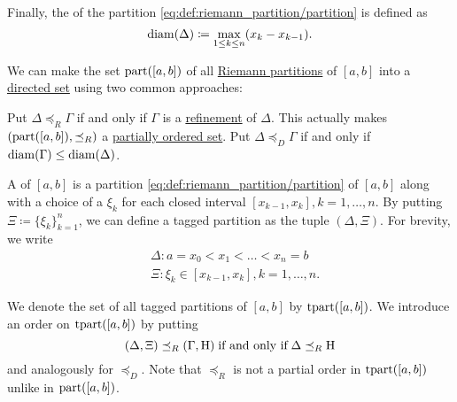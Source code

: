 \begin{definition}
\begin{thmenum}
     Finally, the  of the partition \eqref{eq:def:riemann_partition/partition} is defined as
    \begin{equation}\label{eq:def:riemann_partition/diameter}
      \operatorname{diam}(\Delta) \coloneqq \max_{1 \leq k \leq n} (x_k - x_{k-1}).
    \end{equation}

     We can make the set \( \operatorname{part}([a, b]) \) of all \hyperref[def:riemann_partition/partition]{Riemann partitions} of \( [a, b] \) into a \hyperref[def:directed_set]{directed set} using two common approaches:
    \begin{thmenum}
       Put \( \Delta \preceq_R \Gamma \) if and only if \( \Gamma \) is a \hyperref[def:riemann_partition/refinement]{refinement} of \( \Delta \). This actually makes \( (\operatorname{part}([a, b]), \preceq_R) \) a \hyperref[def:partially_ordered_set]{partially ordered set}.
       Put \( \Delta \preceq_D \Gamma \) if and only if \( \operatorname{diam}(\Gamma) \leq \operatorname{diam}(\Delta) \).
    \end{thmenum}

     A  of \( [a, b] \) is a partition \eqref{eq:def:riemann_partition/partition} of \( [a, b] \) along with a choice of a  \( \xi_k \) for each closed interval \( [x_{k-1}, x_k], k = 1, \ldots, n \). By putting \( \Xi \coloneqq \{ \xi_k \}_{k=1}^n \), we can define a tagged partition as the tuple \( (\Delta, \Xi) \). For brevity, we write
    \begin{equation}\label{eq:def:riemann_partition/tagged}
      \begin{aligned}
        &\Delta: a = x_0 < x_1 < \ldots < x_n = b \\
        &\Xi: \xi_k \in [x_{k-1}, x_k], k = 1, \ldots, n.
      \end{aligned}
    \end{equation}

    We denote the set of all tagged partitions of \( [a, b] \) by \( \operatorname{tpart}([a, b]) \). We introduce an order on \( \operatorname{tpart}([a, b]) \) by putting
    \begin{equation*}
      (\Delta, \Xi) \preceq_R (\Gamma, \Eta) \T{if and only if} \Delta \preceq_R \Eta
    \end{equation*}
    and analogously for \( \preceq_D \). Note that \( \preceq_R \) is not a partial order in \( \operatorname{tpart}([a, b]) \) unlike in \( \operatorname{part}([a, b]) \).
  \end{thmenum}
\end{definition}

